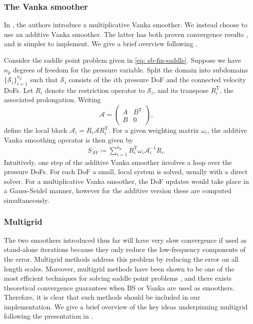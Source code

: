 \documentclass[12pt]{article}
\theoremstyle{theorem}
\begin{document}
\subsubsection{The Vanka smoother}

In \cite{larin2008}, the authors introduce a multiplicative Vanka smoother. We instead choose to use an additive Vanka smoother. The latter has both proven convergence results \cite{saberi2022}, and is simpler to implement. We give a brief overview following \cite{saberi2022}.

Consider the saddle point problem given in \eqref{eq: sb-fin-saddle}. Suppose we have $n_p$ degrees of freedom for the pressure variable. Split the domain into subdomains $\{\mathcal{S}_i\}_{i=1}^{n_p}$ such that $\mathcal{S}_i$ consists of the $i$th pressure DoF and the connected velocity DoFs. Let $R_i$ denote the restriction operator to $\mathcal{S}_i$, and its transpose $R_i^\mathrm{T}$, the associated prolongation. Writing
$$
\mathcal{A} = 
\begin{pmatrix}
    A & B^{\mathrm{T}} \\
    B & 0
\end{pmatrix},
$$
define the local block $\mathcal{A}_i = R_i \mathcal{A} R_i^{\mathrm{T}}$. For a given weighting matrix $\omega_i$, the additive Vanka smoothing operator is then given by
\begin{eqnarray}
    S_{AV} \coloneqq \sum_{i=1}^{n_p} R_i^\mathrm{T}\omega_i \mathcal{A}_i^{-1}R_i.
\end{eqnarray}
Intuitively, one step of the additive Vanka smoother involves a loop over the pressure DoFs. For each DoF a small, local system is solved, usually with a direct solver. For a multiplicative Vanka smoother, the DoF updates would take place in a Gauss-Seidel manner, however for the additive version these are computed simultaneously.

\subsubsection{Multigrid}\label{sec: multigrid}

The two smoothers introduced thus far will have very slow convergence if used as stand-alone iterations because they only reduce the low-frequency components of the error. Multigrid methods address this problem by reducing the error on all length scales. Moreover, multigrid methods have been shown to be one of the most efficient techniques for solving saddle point problems \cite{larin2008}, and there exists theoretical convergence guarantees when BS or Vanka are used as smoothers. Therefore, it is clear that such methods should be included in our implementation. We give a brief overview of the key ideas underpinning multigrid following the presentation in \cite{reusken2008introduction}.
\end{document}
